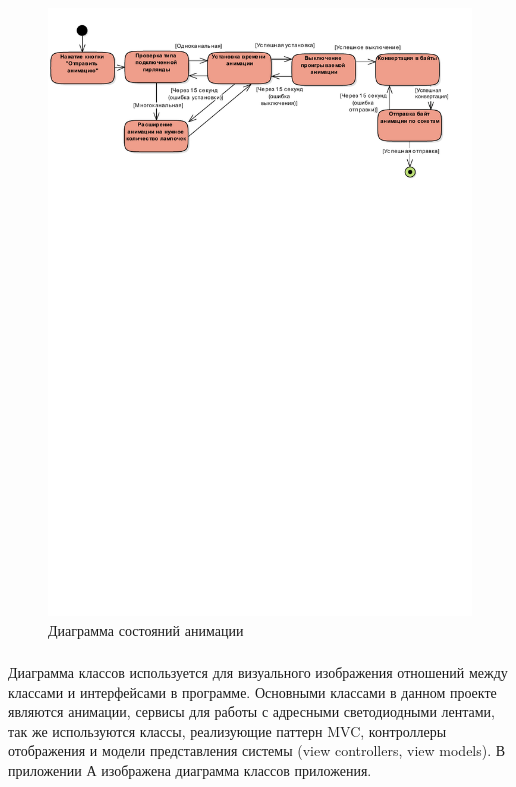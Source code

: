 ~
\begin{figure}[H]
\centering
	\includegraphics[scale=0.9]{figures/diagrams/uml_state.pdf}
	\caption{Диаграмма состояний анимации}
	\label{fig:develop:umlDiagrams:state}
\end{figure}

\vspace*{-\baselineskip}
\subsubsection{}	Диаграмма классов используется для визуального изображения отношений между классами и интерфейсами в программе. Основными классами в данном проекте являются анимации, сервисы для работы с адресными светодиодными лентами, так же используются классы, реализующие паттерн MVC, контроллеры отображения и модели представления системы (view controllers, view models). В приложении А изображена диаграмма классов приложения.
